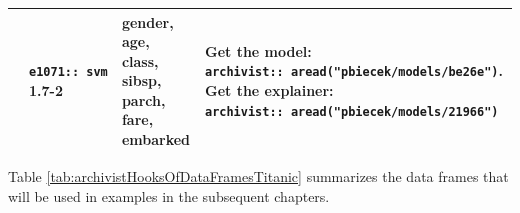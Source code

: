 \documentclass[12pt,]{krantz}
\begin{document}
\begin{longtable}[]{@{}llll@{}}
\begin{minipage}[t]{0.21\columnwidth}
\end{minipage} & \begin{minipage}[t]{0.25\columnwidth}\raggedright
\texttt{e1071::\ svm} 1.7-2\strut
\end{minipage} & \begin{minipage}[t]{0.18\columnwidth}\raggedright
gender, age, class, sibsp, parch, fare, embarked\strut
\end{minipage} & \begin{minipage}[t]{0.25\columnwidth}\raggedright
Get the model: \texttt{archivist::\ aread("pbiecek/models/be26e")}. Get the explainer: \texttt{archivist::\ aread("pbiecek/models/21966")}\strut
\end{minipage}\tabularnewline
\bottomrule
\end{longtable}

Table \ref{tab:archivistHooksOfDataFramesTitanic} summarizes the data frames that will be used in examples in the subsequent chapters.
\end{document}
